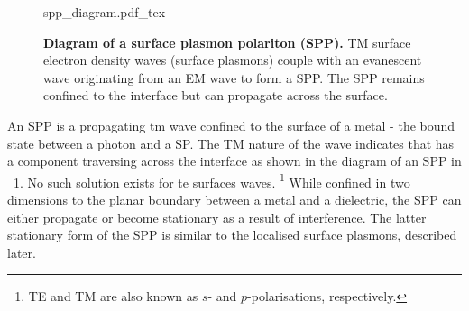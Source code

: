 \documentclass{article}
\begin{document}
\begin{figure}[bt]
\fontsize{10pt}{1em}\selectfont
\def\svgwidth{0.6\textwidth}
{spp_diagram.pdf_tex}
\caption[Diagram of a surface plasmon polariton (SPP)]{\textbf{Diagram of a surface plasmon polariton (SPP).} TM surface electron density waves (surface plasmons) couple with an evanescent wave originating from an EM wave to form a SPP. The SPP remains confined to the interface but can propagate across the surface.}
\label{fig:spp_diagram}
\end{figure}

An SPP is a propagating \gls{tm} wave confined to the surface of a metal - the bound state between a photon and a SP. The TM nature of the wave indicates that  has a component traversing across the interface as shown in the diagram of an SPP in \figurename~\ref{fig:spp_diagram}. No such solution exists for \gls{te} surfaces waves.%
\footnote{TE and TM are also known as $s$- and $p$-polarisations, respectively.}
While confined in two dimensions to the planar boundary between a metal and a dielectric, the SPP can either propagate or become stationary as a result of interference. The latter stationary form of the SPP is similar to the localised surface plasmons, described later.
\end{document}
